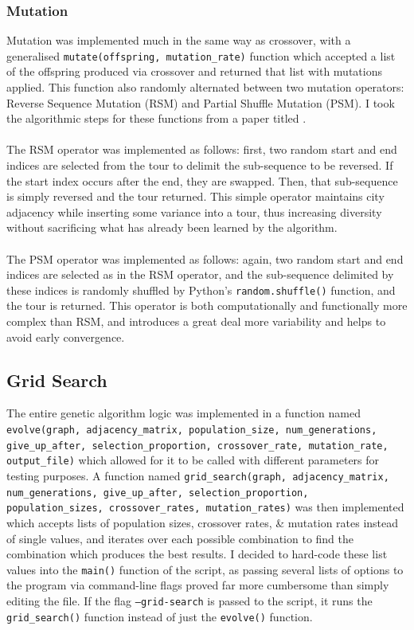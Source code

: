 \documentclass[a4paper]{article}
\begin{document}
\subsubsection{Mutation}
Mutation was implemented much in the same way as crossover, with a generalised \texttt{mutate(offspring, mutation_rate)} function which accepted a list of the offspring produced via crossover and returned that list with mutations applied.
This function also randomly alternated between two mutation operators: Reverse Sequence Mutation (RSM) and Partial Shuffle Mutation (PSM).
I took the algorithmic steps for these functions from a paper titled .\supercite{adboun}
\\\\
The RSM operator was implemented as follows:
first, two random start and end indices are selected from the tour to delimit the sub-sequence to be reversed.
If the start index occurs after the end, they are swapped.
Then, that sub-sequence is simply reversed and the tour returned.
This simple operator maintains city adjacency while inserting some variance into a tour, thus increasing diversity without sacrificing what has already been learned by the algorithm.
\\\\
The PSM operator was implemented as follows:
again, two random start and end indices are selected as in the RSM operator, and the sub-sequence delimited by these indices is randomly shuffled by Python's \texttt{random.shuffle()} function, and the tour is returned.
This operator is both computationally and functionally more complex than RSM, and introduces a great deal more variability and helps to avoid early convergence.

\subsection{Grid Search}
The entire genetic algorithm logic was implemented in a function named \texttt{evolve(graph, adjacency\_matrix, population\_size, num\_generations, give\_up\_after, selection\_proportion, crossover\_rate, mutation\_rate, output\_file)}
which allowed for it to be called with different parameters for testing purposes.
A function named \texttt{grid\_search(graph, adjacency\_matrix, num\_generations, give\_up\_after, selection\_proportion, population\_sizes, crossover\_rates, mutation\_rates)} was then implemented which accepts lists of population sizes, crossover rates, \& mutation rates instead of single values, and iterates over each possible combination to find the combination which produces the best results.
I decided to hard-code these list values into the \texttt{main()} function of the script, as passing several lists of options to the program via command-line flags proved far more cumbersome than simply editing the file.
If the flag \texttt{--grid-search} is passed to the script, it runs the \texttt{grid\_search()} function instead of just the \texttt{evolve()} function.
\end{document}
